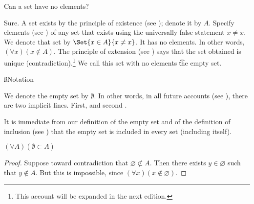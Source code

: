 

Can a set have no elements?


Sure.
A set exists by the principle of existence (see ); denote it by $A$.
Specify elements (see ) of any set that exists using the universally false statement $x \neq x$.
We denote that set by $\Set{x \in A}{x \neq x}$.
It has no elements.
In other words, $(\forall x)(x \not \in A)$.
The principle of extension (see ) says that the set obtained is unique (contradiction).\footnote{This account will be expanded in the next edition.}
We call this set with no elements \t{the empty set.}



%
%

\ss{Notation}

We denote the empty set by $\emptyset$.
In other words, in all future accounts (see ), there are two implicit lines. First,  and second .


It is immediate from our definition of the empty set and of the definition of inclusion (see ) that the empty set is included in every set (including itself).

\begin{proposition}
	$(\forall A)(\emptyset \subset A)$
\end{proposition}
\begin{proof}
	Suppose toward contradiction that $\varnothing \not\subset A$.
	Then there exists $y \in \varnothing$ such that $y \not \in A$.
	But this is impossible, since $(\forall x)(x \not \in \varnothing)$.
\end{proof}